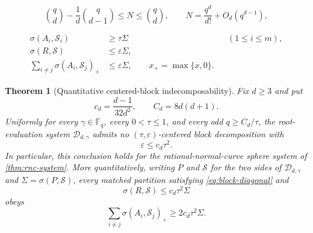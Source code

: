 \documentclass[10pt,a4paper]{amsart}
\newtheorem{theorem}{Theorem}
\begin{document}
\begin{equation}
 \binom qd-\frac1d\binom q{d-1}
 \le N\le\binom qd,
 \qquad
 N=\frac{q^d}{d!}+O_d(q^{d-1}),
\end{equation}

\begin{align}
 \sigma(A_i,\mathcal S_i)&\ge\tau\Sigma
 &&(1\le i\le m),\label{eq:block-diagonal}\\
 \sigma(R,\mathcal S)&\le\varepsilon\Sigma,\label{eq:block-remainder}\\
 \sum_{i\ne j}\sigma(A_i,\mathcal S_j)_+&\le\varepsilon\Sigma,
 \qquad x_+=\max\{x,0\}.\label{eq:block-cross}
\end{align}

\begin{theorem}[Quantitative centered-block indecomposability]\label{thm:rnc-block-indecomp}
Fix $d\ge3$ and put
\[
 c_d=\frac{d-1}{32d^2},
 \qquad
 C_d=8d(d+1).
\]
Uniformly for every $\gamma\in\mathbb F_q$, every $0<\tau\le1$, and every odd $q\ge C_d/\tau$, the root-evaluation system $\mathcal D_{d,\gamma}$ admits no $(\tau,\varepsilon)$-centered block decomposition with
\[
 \varepsilon\le c_d\tau^2.
\]
In particular, this conclusion holds for the rational-normal-curve sphere system of \cref{thm:rnc-system}.  More quantitatively, writing $P$ and $\mathcal S$ for the two sides of $\mathcal D_{d,\gamma}$ and $\Sigma=\sigma(P,\mathcal S)$, every matched partition satisfying \eqref{eq:block-diagonal} and
\[
 \sigma(R,\mathcal S)\le c_d\tau^2\Sigma
\]
obeys
\begin{equation}\label{eq:rnc-cross-lower}
 \sum_{i\ne j}\sigma(A_i,\mathcal S_j)_+
 \ge2c_d\tau^2\Sigma.
\end{equation}
\end{theorem}
\end{document}
